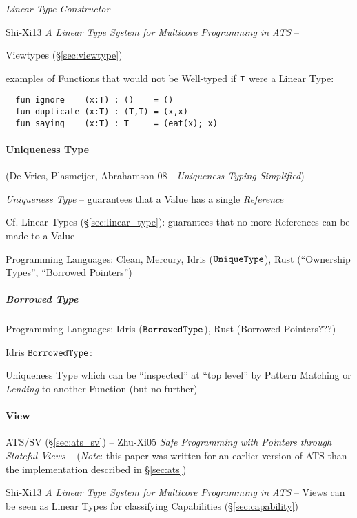 \emph{Linear Type Constructor} %


Shi-Xi13 \emph{A Linear Type System for Multicore Programming in ATS} --

\fist Viewtypes (\S\ref{sec:viewtype})

examples of Functions that would not be Well-typed if $\mathtt{T}$ were
a Linear Type:
\begin{verbatim}
  fun ignore    (x:T) : ()    = ()
  fun duplicate (x:T) : (T,T) = (x,x)
  fun saying    (x:T) : T     = (eat(x); x)
\end{verbatim}



\paragraph{Uniqueness Type}\label{sec:uniqueness_type}\hfill

(De Vries, Plasmeijer, Abrahamson 08 - \emph{Uniqueness Typing
  Simplified})

\emph{Uniqueness Type} -- guarantees that a Value has a single
\emph{Reference}

\fist Cf. Linear Types (\S\ref{sec:linear_type}): guarantees that no
more References can be made to a Value

Programming Languages: Clean, Mercury, Idris ($\mathtt{UniqueType}$), Rust
(``Ownership Types'', ``Borrowed Pointers'')



\subparagraph{Borrowed Type}\label{sec:borrowed_type}\hfill

Programming Languages: Idris ($\mathtt{BorrowedType}$), Rust (Borrowed
Pointers???)

Idris $\mathtt{BorrowedType}$:

Uniqueness Type which can be ``inspected'' at ``top level'' by Pattern
Matching or \emph{Lending} to another Function (but no further)



\paragraph{View}\label{sec:view}\hfill

ATS/SV (\S\ref{sec:ats_sv}) -- Zhu-Xi05 \emph{Safe Programming with
  Pointers through Stateful Views} -- (\emph{Note}: this paper was
written for an earlier version of ATS than the implementation
described in \S\ref{sec:ats})

Shi-Xi13 \emph{A Linear Type System for Multicore Programming in ATS}
-- Views can be seen as Linear Types for classifying Capabilities
(\S\ref{sec:capability})

